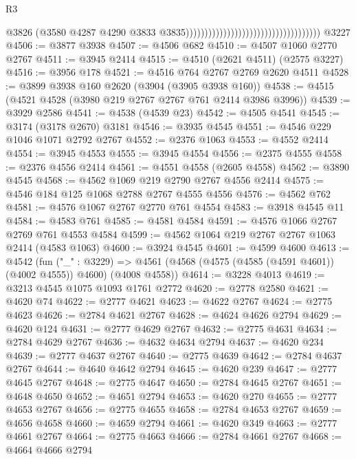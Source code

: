 \begin{lexlean}{R3}
\begin{coremodule}
                                                                          @3826
                                                                          (@3580
                                                                            @4287
                                                                            @4290
                                                                            @3833
                                                                            @3835))))))))))))))))))))))))))))))))))))
    @3227
@4506 := @3877 @3938
@4507 := @4506 @682
@4510 := @4507 @1060 @2770 @2767
@4511 := @3945 @2414
@4515 := @4510 (@2621 @4511) (@2575 @3227)
@4516 := @3956 @178
@4521 := @4516 @764 @2767 @2769 @2620 @4511
@4528 := @3899 @3938 @160 @2620 (@3904 (@3905 @3938 @160))
@4538 := @4515 (@4521 @4528 (@3980 @219 @2767 @2767 @761 @2414 @3986 @3996))
@4539 := @3929 @2586
@4541 := @4538 (@4539 @23)
@4542 := @4505 @4541
@4545 := @3174 (@3178 @2670) @3181
@4546 := @3935 @4545
@4551 := @4546 @229 @1046 @1071 @2792 @2767
@4552 := @2376 @1063
@4553 := @4552 @2414
@4554 := @3945 @4553
@4555 := @3945 @4554
@4556 := @2375 @4555
@4558 := @2376 @4556 @2414
@4561 := @4551 @4558 (@2605 @4558)
@4562 := @3890 @4545
@4568 := @4562 @1069 @219 @2790 @2767 @4556 @2414
@4575 := @4546 @184 @125 @1068 @2788 @2767 @4555 @4556
@4576 := @4562 @762
@4581 := @4576 @1067 @2767 @2770 @761 @4554
@4583 := @3918 @4545 @11
@4584 := @4583 @761
@4585 := @4581 @4584
@4591 := @4576 @1066 @2767 @2769 @761 @4553 @4584
@4599 := @4562 @1064 @219 @2767 @2767 @1063 @2414 (@4583 @1063)
@4600 := @3924 @4545
@4601 := @4599 @4600
@4613 := @4542
    (fun ("_" : @3229) =>
    @4561 (@4568 (@4575 (@4585 (@4591 @4601)) (@4002 @4555)) @4600) (@4008 @4558))
@4614 := @3228 @4013
@4619 := @3213 @4545 @1075 @1093 @1761 @2772
@4620 := @2778 @2580
@4621 := @4620 @74
@4622 := @2777 @4621
@4623 := @4622 @2767
@4624 := @2775 @4623
@4626 := @2784 @4621 @2767
@4628 := @4624 @4626 @2794
@4629 := @4620 @124
@4631 := @2777 @4629 @2767
@4632 := @2775 @4631
@4634 := @2784 @4629 @2767
@4636 := @4632 @4634 @2794
@4637 := @4620 @234
@4639 := @2777 @4637 @2767
@4640 := @2775 @4639
@4642 := @2784 @4637 @2767
@4644 := @4640 @4642 @2794
@4645 := @4620 @239
@4647 := @2777 @4645 @2767
@4648 := @2775 @4647
@4650 := @2784 @4645 @2767
@4651 := @4648 @4650
@4652 := @4651 @2794
@4653 := @4620 @270
@4655 := @2777 @4653 @2767
@4656 := @2775 @4655
@4658 := @2784 @4653 @2767
@4659 := @4656 @4658
@4660 := @4659 @2794
@4661 := @4620 @349
@4663 := @2777 @4661 @2767
@4664 := @2775 @4663
@4666 := @2784 @4661 @2767
@4668 := @4664 @4666 @2794

\end{coremodule}
\end{lexlean}
